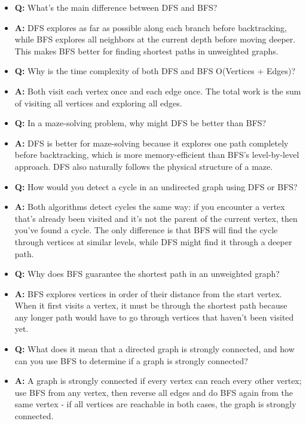 \documentclass[11pt,a4paper]{article}
\begin{document}
\begin{multicols}{2}
\begin{itemize}
    \item \textbf{Q:} What's the main difference between DFS and BFS?
    \item \textbf{A:} DFS explores as far as possible along each branch before backtracking, while BFS explores all neighbors at the current depth before moving deeper. This makes BFS better for finding shortest paths in unweighted graphs.

    \item \textbf{Q:} Why is the time complexity of both DFS and BFS O(Vertices + Edges)?
    \item \textbf{A:} Both visit each vertex once and each edge once. The total work is the sum of visiting all vertices and exploring all edges.
    
    \item \textbf{Q:} In a maze-solving problem, why might DFS be better than BFS?
    \item \textbf{A:} DFS is better for maze-solving because it explores one path completely before backtracking, which is more memory-efficient than BFS's level-by-level approach. DFS also naturally follows the physical structure of a maze.

    \item \textbf{Q:} How would you detect a cycle in an undirected graph using DFS or BFS?
    \item \textbf{A:} Both algorithms detect cycles the same way: if you encounter a vertex that's already been visited and it's not the parent of the current vertex, then you've found a cycle. The only difference is that BFS will find the cycle through vertices at similar levels, while DFS might find it through a deeper path.

    \item \textbf{Q:} Why does BFS guarantee the shortest path in an unweighted graph?
    \item \textbf{A:} BFS explores vertices in order of their distance from the start vertex. When it first visits a vertex, it must be through the shortest path because any longer path would have to go through vertices that haven't been visited yet.

    \item \textbf{Q:} What does it mean that a directed graph is strongly connected, and how can you use BFS to determine if a graph is strongly connected?
    \item \textbf{A:} A graph is strongly connected if every vertex can reach every other vertex; use BFS from any vertex, then reverse all edges and do BFS again from the same vertex - if all vertices are reachable in both cases, the graph is strongly connected.
\end{itemize}


\end{multicols}
\end{document}
